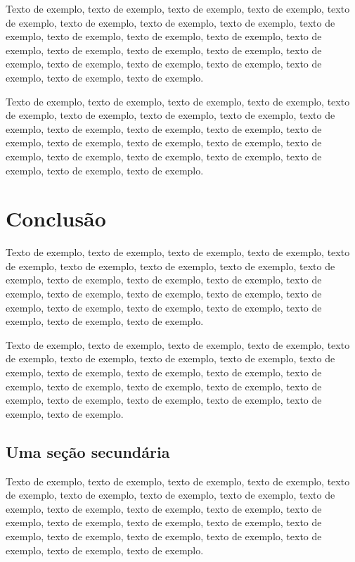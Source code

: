 \documentclass[
	12pt,				%
	oneside,			%
	a4paper,			%
	english,			%
	brazil				%
	]{abntex2ppgsi}
\begin{document}
Texto de exemplo, texto de exemplo, texto de exemplo, texto de exemplo, texto de exemplo, texto de exemplo, texto de exemplo, texto de exemplo, texto de exemplo, texto de exemplo, texto de exemplo, texto de exemplo, texto de exemplo, texto de exemplo, texto de exemplo, texto de exemplo, texto de exemplo, texto de exemplo, texto de exemplo, texto de exemplo, texto de exemplo, texto de exemplo, texto de exemplo.

Texto de exemplo, texto de exemplo, texto de exemplo, texto de exemplo, texto de exemplo, texto de exemplo, texto de exemplo, texto de exemplo, texto de exemplo, texto de exemplo, texto de exemplo, texto de exemplo, texto de exemplo, texto de exemplo, texto de exemplo, texto de exemplo, texto de exemplo, texto de exemplo, texto de exemplo, texto de exemplo, texto de exemplo, texto de exemplo, texto de exemplo.

\chapter{Conclusão}

Texto de exemplo, texto de exemplo, texto de exemplo, texto de exemplo, texto de exemplo, texto de exemplo, texto de exemplo, texto de exemplo, texto de exemplo, texto de exemplo, texto de exemplo, texto de exemplo, texto de exemplo, texto de exemplo, texto de exemplo, texto de exemplo, texto de exemplo, texto de exemplo, texto de exemplo, texto de exemplo, texto de exemplo, texto de exemplo, texto de exemplo.

Texto de exemplo, texto de exemplo, texto de exemplo, texto de exemplo, texto de exemplo, texto de exemplo, texto de exemplo, texto de exemplo, texto de exemplo, texto de exemplo, texto de exemplo, texto de exemplo, texto de exemplo, texto de exemplo, texto de exemplo, texto de exemplo, texto de exemplo, texto de exemplo, texto de exemplo, texto de exemplo, texto de exemplo, texto de exemplo.

\section{Uma seção secundária}

Texto de exemplo, texto de exemplo, texto de exemplo, texto de exemplo, texto de exemplo, texto de exemplo, texto de exemplo, texto de exemplo, texto de exemplo, texto de exemplo, texto de exemplo, texto de exemplo, texto de exemplo, texto de exemplo, texto de exemplo, texto de exemplo, texto de exemplo, texto de exemplo, texto de exemplo, texto de exemplo, texto de exemplo, texto de exemplo, texto de exemplo.
\end{document}
